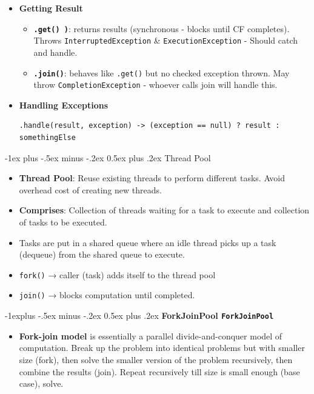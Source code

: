 \documentclass[12pt, landscape]{article}
\makeatletter
\newcommand{\code}[1]{\colorbox{gray!25!}{\lstinline|#1|}}
\renewcommand{\section}{\@startsection{section}{1}{0mm}%
                                {-1ex plus -.5ex minus -.2ex}%
                                {0.5ex plus .2ex}%
                                {\normalfont\large\bfseries}}
\renewcommand{\subsection}{\@startsection{subsection}{2}{0.1mm}%
                                {-1explus -.5ex minus -.2ex}%
                                {0.5ex plus .2ex}%
                                {\normalfont\normalsize\bfseries}}
\makeatother
\begin{document}
\begin{multicols*}{3}
\begin{itemize}
\begin{itemize}
\end{itemize}
\item \textbf{Getting Result}
\begin{itemize}
\item \textbf{\code{.get() )}}: returns results (synchronous - blocks until CF completes). Throws \code{InterruptedException} \& \code{ExecutionException} - Should catch and handle.
\item \textbf{\code{.join()}}: behaves like \code{.get()} but no checked exception thrown. May throw \code{CompletionException} - whoever calls join will handle this.
\end{itemize}
\item \textbf{Handling Exceptions}
\begin{lstlisting}
.handle(result, exception) -> (exception == null) ? result : somethingElse
\end{lstlisting}
\end{itemize}


\section{Thread Pool}
\begin{itemize}
\item \textbf{Thread Pool}: Reuse existing threads to perform different tasks. Avoid overhead cost of creating new threads.
\item \textbf{Comprises}: Collection of threads waiting for a task to execute and collection of tasks to be executed. 
\item Tasks are put in a shared queue where an idle thread picks up a task (dequeue) from the shared queue to execute. 
\item \code{fork()} → caller (task) adds itself to the thread pool
\item \code{join()} → blocks computation until completed.
\end{itemize}



\subsection{\textbf{ForkJoinPool \code{ForkJoinPool}}}
\begin{itemize}
\item \textbf{Fork-join model} is essentially a parallel divide-and-conquer model of computation. Break up the problem into identical problems but with smaller size (fork), then solve the smaller version of the problem recursively, then combine the results (join). Repeat recursively till size is small enough (base case), solve.


\end{itemize}
\end{multicols*}
\end{document}
